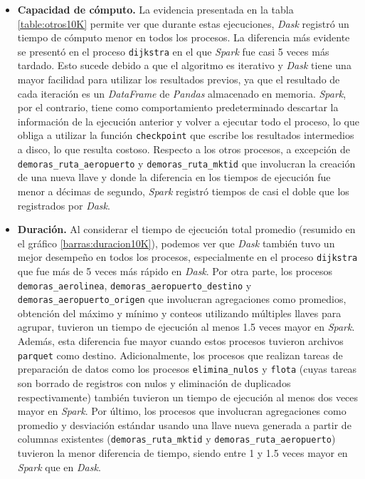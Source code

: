 \begin{itemize}
	\item \textbf{Capacidad de cómputo.} La evidencia presentada en la tabla \ref{table:otros10K} permite ver que durante estas ejecuciones, \textit{Dask} registró un tiempo de  cómputo menor en todos los procesos. La diferencia más evidente se presentó en el proceso \texttt{dijkstra} en el que \textit{Spark} fue casi 5 veces más tardado. Esto sucede debido a que el algoritmo es iterativo y \textit{Dask} tiene una mayor facilidad para utilizar los resultados previos, ya que el resultado de cada iteración es un \textit{DataFrame} de \textit{Pandas} almacenado en memoria. \textit{Spark}, por el contrario, tiene como comportamiento predeterminado descartar la información de la ejecución anterior y volver a ejecutar todo el proceso, lo que obliga a utilizar la función \texttt{checkpoint} que escribe los resultados intermedios a disco, lo que resulta costoso. Respecto a los otros procesos, a excepción de \texttt{demoras\_ruta\_aeropuerto} y \texttt{demoras\_ruta\_mktid} que involucran la creación de una nueva llave y donde la diferencia en los tiempos de ejecución fue menor a décimas de segundo, \textit{Spark} registró tiempos de casi el doble que los registrados por \textit{Dask}.
	
	\item \textbf{Duración.} Al considerar el tiempo de ejecución total promedio (resumido en el gráfico \ref{barras:duracion10K}), podemos ver que \textit{Dask} también tuvo un mejor desempeño en todos los procesos, especialmente en el proceso \texttt{dijkstra} que fue más de 5 veces más rápido en \textit{Dask}. Por otra parte, los procesos \texttt{demoras\_aerolinea}, \texttt{demoras\_aeropuerto\_destino} y \texttt{demoras\_aeropuerto\_origen} que involucran agregaciones como promedios, obtención del máximo y mínimo y conteos utilizando múltiples llaves para agrupar, tuvieron un tiempo de ejecución al menos 1.5 veces mayor en \textit{Spark}. Además, esta diferencia fue mayor cuando estos procesos tuvieron archivos \texttt{parquet} como destino. Adicionalmente, los procesos que realizan tareas de preparación de datos como los procesos \texttt{elimina\_nulos} y \texttt{flota} (cuyas tareas son borrado de registros con nulos y eliminación de duplicados respectivamente) también tuvieron un tiempo de ejecución al menos dos veces mayor en \textit{Spark}. Por último, los procesos que involucran agregaciones como promedio y desviación estándar usando una llave nueva generada a partir de columnas existentes (\texttt{demoras\_ruta\_mktid} y \texttt{demoras\_ruta\_aeropuerto}) tuvieron la menor diferencia de tiempo, siendo entre 1 y 1.5 veces mayor en \textit{Spark} que en \textit{Dask}.  
	
\end{itemize}


